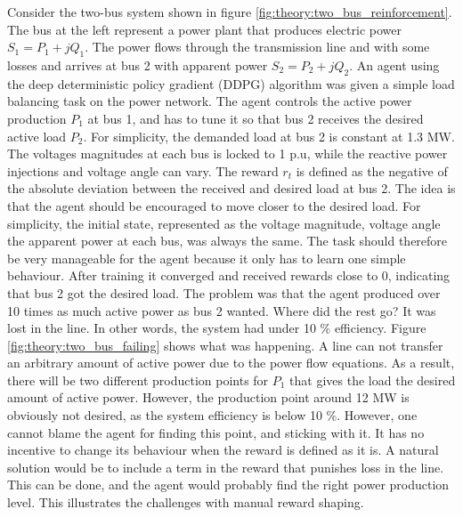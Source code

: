 \documentclass[class=book, crop=false]{standalone}
\begin{document}
Consider the two-bus system shown in figure \ref{fig:theory:two_bus_reinforcement}. The bus at the left represent a power plant that produces electric power $S_{1} = P_{1} + jQ_{1}$. The power flows through the transmission line and with some losses and arrives at bus 2 with apparent power $S_{2} = P_{2} + jQ_{2}$. An agent using the deep deterministic policy gradient (DDPG) algorithm was given a simple load balancing task on the power network. The agent controls the active power production $P_{1}$ at bus 1, and has to tune it so that bus 2 receives the desired active load $P_{2}$. For simplicity, the demanded load at bus 2 is constant at 1.3 MW. The voltages magnitudes at each bus is locked to 1 p.u, while the reactive power injections and voltage angle can vary. The reward $r_{t}$ is defined as the negative of the absolute deviation between the received and desired load at bus 2. The idea is that the agent should be encouraged to move closer to the desired load. For simplicity, the initial state, represented as the voltage magnitude, voltage angle the apparent power at each bus, was always the same. The task should therefore be very manageable for the agent because it only has to learn one simple behaviour. After training it converged and received rewards close to 0, indicating that bus 2 got the desired load. The problem was that the agent produced over 10 times as much active power as bus 2 wanted. Where did the rest go? It was lost in the line. In other words, the system had under 10 \% efficiency. Figure \ref{fig:theory:two_bus_failing} shows what was happening. A line can not transfer an arbitrary amount of active power due to the power flow equations. As a result, there will be two different production points for $P_{1}$ that gives the load the desired amount of active power. However, the production point around 12 MW is obviously not desired, as the system efficiency is below 10 \%. However, one cannot blame the agent for finding this point, and sticking with it. It has no incentive to change its behaviour when the reward is defined as it is. A natural solution would be to include a term in the reward that punishes loss in the line. This can be done, and the agent would probably find the right power production level. This illustrates the challenges with manual reward shaping. 
\end{document}
